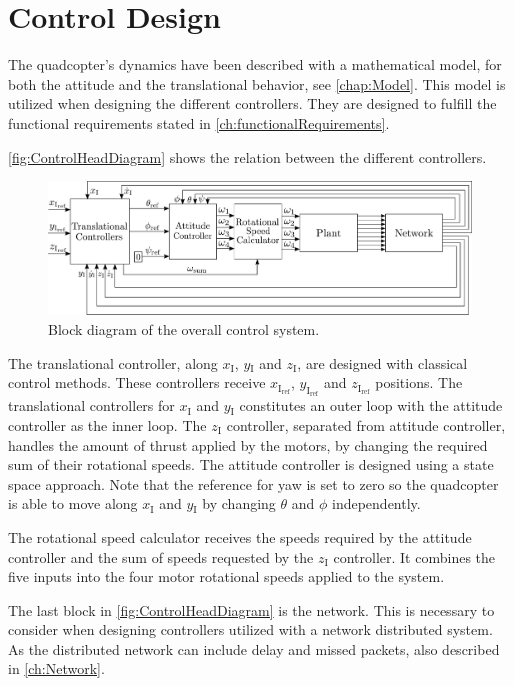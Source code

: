 \chapter{Control Design}\label{chap:Control}
The quadcopter's dynamics have been described with a mathematical model, for both the attitude and the translational behavior, see \autoref{chap:Model}. This model is utilized when designing the different controllers. They are designed to fulfill the functional requirements stated in \autoref{ch:functionalRequirements}.

\autoref{fig:ControlHeadDiagram} shows the relation between the different controllers.

\begin{figure}[H]
	\centering
	\includegraphics[width=1 \textwidth]{figures/ControlDiagramPoster}
	\caption{Block diagram of the overall control system.}
	\label{fig:ControlHeadDiagram}
\end{figure}
%
The translational controller, along $x_{\mathrm{I}}$, $y\mathrm{_I}$ and $z\mathrm{_I}$, are designed with classical control methods. These controllers receive $x_\mathrm{I_{ref}}$, $y_\mathrm{I_{ref}}$ and $z_\mathrm{I_{ref}}$ positions. The translational controllers for $x\mathrm{_I}$ and $y\mathrm{_I}$ constitutes an outer loop with the attitude controller as the inner loop. The $z\mathrm{_I}$ controller, separated from attitude controller, handles the amount of thrust applied by the motors, by changing the required sum of their rotational speeds. The attitude controller is designed using a state space approach. Note that the reference for yaw is set to zero so the quadcopter is able to move along $x_{\mathrm{I}}$ and $y\mathrm{_I}$ by changing $\theta$ and $\phi$ independently.

The rotational speed calculator receives the speeds required by the attitude controller and the sum of speeds requested by the $z\mathrm{_I}$ controller. It combines the five inputs into the four motor rotational speeds applied to the system.

The last block in \autoref{fig:ControlHeadDiagram} is the network. This is necessary to consider when designing controllers utilized with a network distributed system. As the distributed network can include delay and missed packets, also described in \autoref{ch:Network}. 

